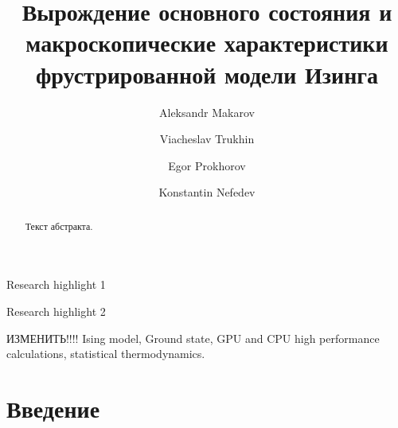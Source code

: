 \documentclass[utf8, babel, sor, jor, amsmath, amssymb, reprint]{elsarticle} %
\begin{document}
\begin{frontmatter}


\title{Вырождение основного состояния и макроскопические характеристики фрустрированной модели Изинга}

\author[mainaddress, secondaryaddress]{Aleksandr Makarov}

\author[mainaddress, secondaryaddress]{Viacheslav Trukhin}

\author[mainaddress]{Egor Prokhorov}

\author[mainaddress, secondaryaddress]{Konstantin Nefedev}


\address[mainaddress]{Far Eastern Federal University, Vladivostok, Russky Island, 10 Ajax Bay, 690922, the Russian Federation}
\address[secondaryaddress]{Institute of Applied Mathematics, Far Eastern Branch, Russian Academy of Science, Vladivostok, Radio 7, 690041, the Russian Federation}

\begin{abstract}

Текст абстракта.  

\end{abstract}


\begin{graphicalabstract}
\end{graphicalabstract}


\begin{highlights}
	\item Research highlight 1
	\item Research highlight 2
\end{highlights}


\begin{keyword}
	ИЗМЕНИТЬ!!!! Ising model, Ground state, GPU and CPU high performance calculations, statistical thermodynamics.
\end{keyword}


\end{frontmatter}

\linenumbers

\newpage
\tableofcontents

\newpage
\section{Введение}
\end{document}

